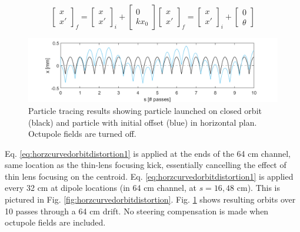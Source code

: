 \begin{subequations}
\begin{equation}
\begin{bmatrix} x \\ x' \end{bmatrix}_f = \begin{bmatrix} x \\ x' \end{bmatrix}_i + \begin{bmatrix} 0 \\ kx_0 \end{bmatrix}
\label{eq:horzcurvedorbitdistortion1}
\end{equation}
\begin{equation}
\begin{bmatrix} x \\ x' \end{bmatrix}_f = \begin{bmatrix} x \\ x' \end{bmatrix}_i + \begin{bmatrix} 0 \\ \theta \end{bmatrix}
\label{eq:horzcurvedorbitdistortion2}
\end{equation}
\end{subequations}

\begin{figure}
\centering
\includegraphics[width=\textwidth]{5.figures/steeringtolerance/sp_traces.png}
\caption{Particle tracing results showing particle launched on closed orbit (black) and particle with initial offset (blue) in horizontal plan. Octupole fields are turned off.}
\label{fig:horsptraces}
\end{figure}


Eq. \ref{eq:horzcurvedorbitdistortion1} is applied at the ends of the 64 cm channel, same location as the thin-lens focusing kick, essentially cancelling the effect of thin lens focusing on the centroid. Eq. \ref{eq:horzcurvedorbitdistortion1} is applied every 32 cm at dipole locations (in 64 cm channel, at $s=16,48$ cm). This is pictured in Fig. \ref{fig:horzcurvedorbitdistortion}. Fig. \ref{fig:horsptraces} shows resulting orbits over 10 passes through a 64 cm drift. No steering compensation is made when octupole fields are included.


